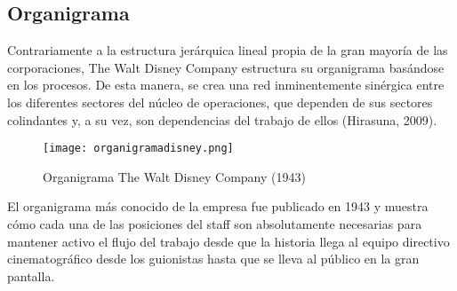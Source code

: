 \subsection{Organigrama}

Contrariamente a la estructura jerárquica lineal propia de la gran mayoría de las corporaciones, The Walt Disney Company estructura su organigrama basándose en los procesos. De esta manera, se crea una red inminentemente sinérgica entre los diferentes sectores del núcleo de operaciones, que dependen de sus sectores colindantes y, a su vez, son dependencias del trabajo de ellos (Hirasuna, 2009).

\begin{figure}[!htb]
	\centering
		\texttt{[image: organigramadisney.png]}
		\caption{\label{fig:frog}Organigrama The Walt Disney Company (1943)}
\end{figure}

El organigrama más conocido de la empresa fue publicado en 1943 y muestra cómo cada una de las posiciones del staff son absolutamente necesarias para mantener activo el flujo del trabajo desde que la historia llega al equipo directivo cinematográfico desde los guionistas hasta que se lleva al público en la gran pantalla.